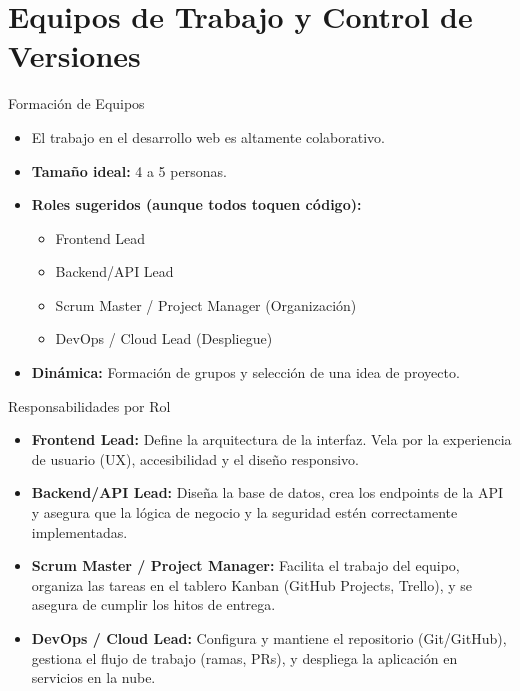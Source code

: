 \documentclass{beamer}
\begin{document}
\section{Equipos de Trabajo y Control de Versiones}

\begin{frame}{Formación de Equipos}
    \begin{itemize}
        \item El trabajo en el desarrollo web es altamente colaborativo.
        \item \textbf{Tamaño ideal:} 4 a 5 personas.
        \item \textbf{Roles sugeridos (aunque todos toquen código):}
        \begin{itemize}
            \item Frontend Lead
            \item Backend/API Lead
            \item Scrum Master / Project Manager (Organización)
            \item DevOps / Cloud Lead (Despliegue)
        \end{itemize}
        \item \textbf{Dinámica:} Formación de grupos y selección de una idea de proyecto.
    \end{itemize}
\end{frame}

\begin{frame}{Responsabilidades por Rol}
    \begin{itemize}
        \item \textbf{Frontend Lead:} Define la arquitectura de la interfaz. Vela por la experiencia de usuario (UX), accesibilidad y el diseño responsivo.
        \item \textbf{Backend/API Lead:} Diseña la base de datos, crea los endpoints de la API y asegura que la lógica de negocio y la seguridad estén correctamente implementadas.
        \item \textbf{Scrum Master / Project Manager:} Facilita el trabajo del equipo, organiza las tareas en el tablero Kanban (GitHub Projects, Trello), y se asegura de cumplir los hitos de entrega.
        \item \textbf{DevOps / Cloud Lead:} Configura y mantiene el repositorio (Git/GitHub), gestiona el flujo de trabajo (ramas, PRs), y despliega la aplicación en servicios en la nube.
    \end{itemize}
\end{frame}
\end{document}
